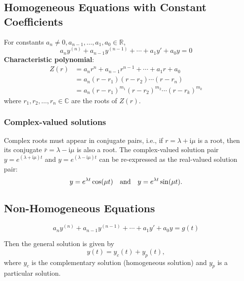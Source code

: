 \documentclass[10pt,UTF8]{article}
\theoremstyle{definition}
\newtheorem{definition inner}{Definition}[section]
\theoremstyle{definition}
\newtheorem{theorem inner}{Theorem}[section]
\theoremstyle{definition}
\newtheorem*{proof inner}{\textit{Proof}}
\theoremstyle{plain}
\newtheorem{tip inner}{Tip}[section]
\theoremstyle{remark}
\newcommand{\iu}{\mathrm{i}}  %
\begin{document}
\subsection{Homogeneous Equations with Constant Coefficients}

For constants \(a_n \ne 0, a_{n-1}, \ldots, a_1, a_0 \in \mathbb{R}\),
\begin{equation*}
  a_n y^{(n)} + a_{n-1} y^{(n-1)} + \cdots + a_1 y' + a_0 y = 0
\end{equation*}
\textbf{Characteristic polynomial}:
\begin{align*}
  Z(r) &= a_n r^n + a_{n-1} r^{n-1} + \cdots + a_1 r + a_0 \\
  &= a_n (r - r_1)(r - r_2) \cdots (r - r_n) \\
  &= a_n {(r - r_1)}^{m_1} {(r - r_2)}^{m_2} \cdots {(r - r_k)}^{m_k}
\end{align*}
where \(r_1, r_2, \ldots, r_n \in \mathbb{C}\) are the roots of \(Z(r)\).

\subsubsection*{Complex-valued solutions}

Complex roots must appear in conjugate pairs, i.e., if
\(r = \lambda + \iu \mu \) is a root,
then its conjugate \(\bar{r} = \lambda - \iu \mu \) is also a root.
The complex-valued solution pair \(y = e^{(\lambda + \iu \mu) t}\)
and \(y = e^{(\lambda - \iu \mu) t}\) can be re-expressed
as the real-valued solution pair:
\begin{equation*}
  y = e^{\lambda t} \cos(\mu t) \qand
  y = e^{\lambda t} \sin(\mu t).
\end{equation*}

\subsection{Non-Homogeneous Equations}

\begin{equation*}
  a_n y^{(n)} + a_{n-1} y^{(n-1)} + \cdots + a_1 y' + a_0 y = g(t)
\end{equation*}

Then the general solution is given by
\begin{equation*}
  y(t) = y_c(t) + y_p(t),
\end{equation*}
where \(y_c\) is the complementary solution (homogeneous solution)
and \(y_p\) is a particular solution.
\end{document}
